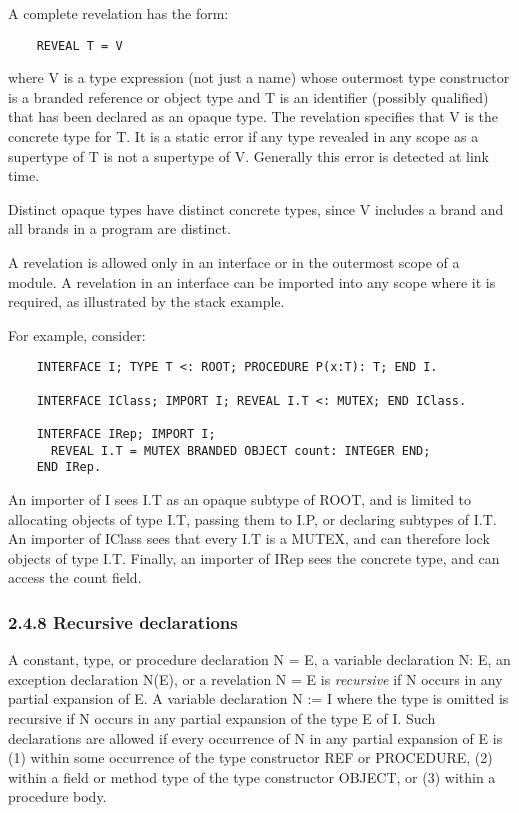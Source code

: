 \documentclass[10pt]{article}
\begin{document}
  A complete revelation has the form: 
\begin{verbatim}
    REVEAL T = V
\end{verbatim}
 where V is a type expression (not just a name) whose outermost type constructor is a branded reference or object type and T is an identifier (possibly qualified) that has been declared as an opaque type. The revelation specifies that V is the concrete type for T. It is a static error if any type revealed in any scope as a supertype of T is not a supertype of V. Generally this error is detected at link time. 


  Distinct opaque types have distinct concrete types, since V includes a brand and all brands in a program are distinct. 


 A revelation is allowed only in an interface or in the outermost scope of a module. A revelation in an interface can be imported into any scope where it is required, as illustrated by the stack example. 


  For example, consider: 
\begin{verbatim}
    INTERFACE I; TYPE T <: ROOT; PROCEDURE P(x:T): T; END I.

    INTERFACE IClass; IMPORT I; REVEAL I.T <: MUTEX; END IClass.

    INTERFACE IRep; IMPORT I;
      REVEAL I.T = MUTEX BRANDED OBJECT count: INTEGER END;
    END IRep.
\end{verbatim}
 An importer of I sees I.T as an opaque subtype of ROOT, and is limited to allocating objects of type I.T, passing them to I.P, or declaring subtypes of I.T. An importer of IClass sees that every I.T is a MUTEX, and can therefore lock objects of type I.T. Finally, an importer of IRep sees the concrete type, and can access the count field. 


 
\subsubsection*{2.4.8 Recursive declarations}


  A constant, type, or procedure declaration N = E, a variable declaration N: E, an exception declaration N(E), or a revelation N = E is \emph{recursive}
 if N occurs in any partial expansion of E. A variable declaration N := I where the type is omitted is recursive if N occurs in any partial expansion of the type E of I. Such declarations are allowed if every occurrence of N in any partial expansion of E is (1) within some occurrence of the type constructor REF or PROCEDURE, (2) within a field or method type of the type constructor OBJECT, or (3) within a procedure body. 
\end{document}
